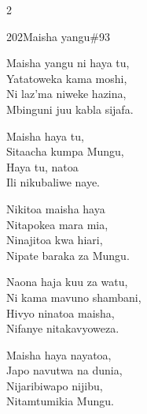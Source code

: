 \begin{multicols}{2}
\begin{hymn}{202}{Maisha yangu}{\#93}
\begin{stanza}
Maisha yangu ni haya tu,\\
Yatatoweka kama moshi,\\
Ni laz'ma niweke hazina,\\
Mbinguni juu kabla sijafa.
\end{stanza}
\begin{chorus}
Maisha haya tu,\\
Sitaacha kumpa Mungu,\\
Haya tu, natoa\\
Ili nikubaliwe naye.
\end{chorus}
\begin{stanza}
Nikitoa maisha haya\\
Nitapokea mara mia,\\
Ninajitoa kwa hiari,\\
Nipate baraka za Mungu.
\end{stanza}
\begin{stanza}
Naona haja kuu za watu,\\
Ni kama mavuno shambani,\\
Hivyo ninatoa maisha,\\
Nifanye nitakavyoweza.
\end{stanza}
\begin{stanza}
Maisha haya nayatoa,\\
Japo navutwa na dunia,\\
Nijaribiwapo nijibu,\\
Nitamtumikia Mungu.
\end{stanza}
\end{hymn}


\end{multicols}
